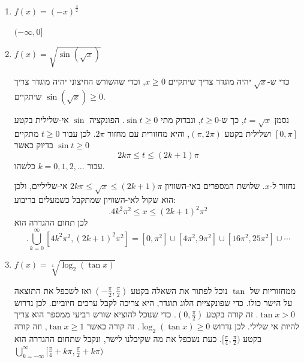 \begin{enumerate}
\item  $f(x) = (-x)^{\frac{3}{2}}$
\begin{solbox}
$(- \infty, 0]$
\end{solbox}

\item  $f(x) = \sqrt{\sin(\sqrt{x})}$
\begin{solbox}
כדי ש-$\sqrt x$ יהיה מוגדר צריך שיתקיים $x\geq0$, וכדי שהשורש החיצוני יהיה מוגדר צריך שיתקיים
$\sin(\sqrt x)\geq0$.

נסמן $t=\sqrt x$, כך ש-$t\geq0$, ונבדוק מתי $\sin t\geq0$. הפונקציה $\sin$ אי-שלילית בקטע $[0,\pi]$ ושלילית בקטע $(\pi,2\pi)$, והיא מחזורית עם מחזור $2\pi$. לכן עבור $t\geq0$ מתקיים $\sin t\geq 0$ בדיוק כאשר
$$2k\pi\leq t\leq (2k+1)\pi$$
עבור $k=0,1,2,\ldots$ כלשהו.

נחזור ל-$x$. שלושת המספרים באי-השוויון
$2k\pi\leq \sqrt x\leq (2k+1)\pi$
אי-שליליים, ולכן הוא שקול לאי-השוויון שמתקבל כשמעלים בריבוע:
$$.4k^2\pi^2\leq x\leq (2k+1)^2\pi^2$$
לכן תחום ההגדרה הוא
$$.\bigcup_{k=0}^{\infty} \left[4k^2 \pi^2, (2k + 1)^2 \pi^2 \right]=[0,\pi^2]\cup[4\pi^2,9\pi^2]\cup[16\pi^2,25\pi^2]\cup\cdots$$
\end{solbox}

\item  $f(x) = \sqrt[4]{\log_2(\tan x)}$
\begin{solbox}
ממחזוריות של
$\tan$
נוכל לפתור את השאלה בקטע
$(-\frac{\pi}{2}, \frac{\pi}{2})$
ואז לשכפל את התוצאה על הישר כולו.
כדי שפונקציית הלוג תוגדר, היא צריכה לקבל ערכים חיוביים. לכן נדרוש
$\tan x > 0$.
זה קורה בקטע
$(0, \frac{\pi}{2})$.
כדי שנוכל להוציא שורש רביעי ממספר הוא צריך להיות אי שלילי. לכן נדרוש
$\log_2 (\tan x) \geq 0$.
זה קורה כאשר
$\tan x \geq 1$,
וזה קורה בקטע
$[\frac{\pi}{4}, \frac{\pi}{2})$.
כעת נשכפל את מה שקיבלנו לישר, ונקבל שתחום ההגדרה הוא
  $\bigcup_{k=-\infty}^{\infty} [\frac{\pi}{4} + k \pi, \frac{\pi}{2} + k \pi )$
\end{solbox}
\eMs
\end{enumerate}
